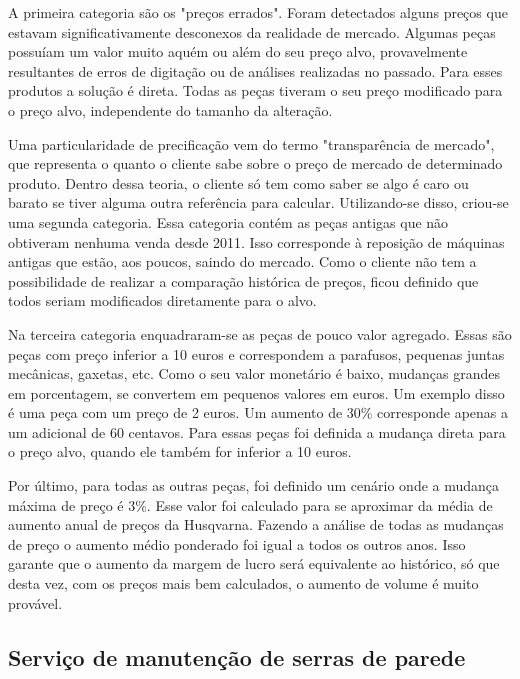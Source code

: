 \documentclass[12pt]{article}
\begin{document}
	A primeira categoria são os "preços errados". Foram detectados alguns preços que estavam significativamente desconexos da realidade de mercado. Algumas peças possuíam um valor muito aquém ou além do seu preço alvo, provavelmente resultantes de erros de digitação ou de análises realizadas no passado. Para esses produtos a solução é direta. Todas as peças tiveram o seu preço modificado para o preço alvo, independente do tamanho da alteração.

	Uma particularidade de precificação vem do termo "transparência de mercado", que representa o quanto o cliente sabe sobre o preço de mercado de determinado produto. Dentro dessa teoria, o cliente só tem como saber se algo é caro ou barato se tiver alguma outra referência para calcular. Utilizando-se disso, criou-se uma segunda categoria. Essa categoria contém as peças antigas que não obtiveram nenhuma venda desde 2011. Isso corresponde à reposição de máquinas antigas que estão, aos poucos, saindo do mercado. Como o cliente não tem a possibilidade de realizar a comparação histórica de preços, ficou definido que todos seriam modificados diretamente para o alvo.

	Na terceira categoria enquadraram-se as peças de pouco valor agregado. Essas são peças com preço inferior a 10 euros e correspondem a parafusos, pequenas juntas mecânicas, gaxetas, etc. Como o seu valor monetário é baixo, mudanças grandes em porcentagem, se convertem em pequenos valores em euros. Um exemplo disso é uma peça com um preço de 2 euros. Um aumento de 30\% corresponde apenas a um adicional de 60 centavos. Para essas peças foi definida a mudança direta para o preço alvo, quando ele também for inferior a 10 euros.

	Por último, para todas as outras peças, foi definido um cenário onde a mudança máxima de preço é 3\%. Esse valor foi calculado para se aproximar da média de aumento anual de preços da Husqvarna. Fazendo a análise de todas as mudanças de preço o aumento médio ponderado foi igual a todos os outros anos. Isso garante que o aumento da margem de lucro será equivalente ao histórico, só que desta vez, com os preços mais bem calculados, o aumento de volume é muito provável.

\subsection{Serviço de manutenção de serras de parede}
\end{document}
